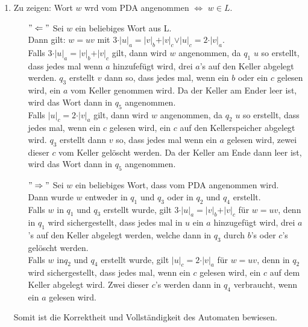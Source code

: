 \documentclass[11pt]{article}
\begin{document}
\begin{enumerate}[label=\alph*)]
\item Zu zeigen: Wort $w$ wrd vom PDA angenommen $\Leftrightarrow$ $w\in L$.
\begin{itemize}
\item[$"\Leftarrow"$] Sei $w$ ein beliebiges Wort aus L.
\\Dann gilt: $w=uv$ mit $3\cdot \vert u \vert _a = \vert v \vert _b + \vert v \vert _c \lor \vert u \vert _c = 2\cdot \vert v \vert _a$.
\\Falls $3\cdot \vert u \vert _a = \vert v \vert _b + \vert v \vert _c$ gilt, dann wird $w$ angenommen, da $q_1$ $u$ so erstellt, dass jedes mal wenn $a$ hinzufefügt wird, drei $a$'s auf den Keller abgelegt werden. $q_3$ erstellt $v$ dann so, dass jedes mal, wenn ein $b$ oder ein $c$ gelesen wird, ein $a$ vom Keller genommen wird. Da der Keller am Ender leer ist, wird das Wort dann in $q_5$ angenommen.
\\Falls $\vert u \vert _c = 2\cdot \vert v \vert _a$ gilt, dann wird $w$ angenommen, da $q_2$ $u$ so erstellt, dass jedes mal, wenn ein $c$ gelesen wird, ein $c$ auf den Kellerspeicher abgelegt wird. $q_3$ erstellt dann $v$ so, dass jedes mal wenn ein $a$ gelesen wird, zewei dieser $c$ vom Keller gelöscht werden. Da der Keller am Ende dann leer ist, wird das Wort dann in $q_5$ angenommen.

\item[$"\Rightarrow"$] Sei $w$ ein beliebiges Wort, dass vom PDA angenommen wird.
\\Dann wurde $w$ entweder in $q_1$ und $q_3$ oder in $q_2$ und $q_4$ erstellt. \\Falls $w$ in $q_1$ und $q_3$ erstellt wurde, gilt  $3\cdot \vert u \vert _a = \vert v \vert _b + \vert v \vert _c$ für $w=uv$, denn in $q_1$ wird sichergestellt, dass jedes mal in $u$ ein $a$ hinzugefügt wird, drei $a$'s auf den Keller abgelegt werden, welche dann in $q_3$ durch $b$'s oder $c$'s gelöscht werden.
\\Falls $w$ in$q_2$ und $q_4$ erstellt wurde, gilt $\vert u \vert _c = 2\cdot \vert v \vert _a$ für $w=uv$, denn in $q_2$ wird sichergestellt, dass jedes mal, wenn ein $c$ gelesen wird, ein $c$ auf dem Keller abgelegt wird. Zwei dieser $c$'s werden dann in $q_4$ verbraucht, wenn ein $a$ gelesen wird.
\end{itemize}

Somit ist die Korrektheit und Vollständigkeit des Automaten bewiesen. 
\end{enumerate}
\end{document}
